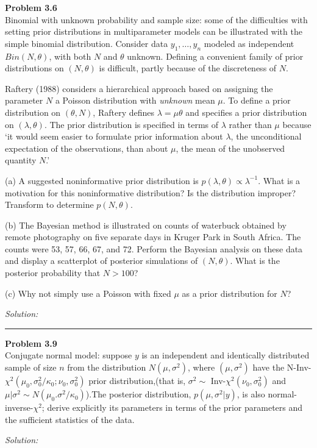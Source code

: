 \documentclass[a4paper, 11pt]{article}
\newenvironment{problem}[2][Problem]
    { \begin{mdframed}[backgroundcolor=gray!20] \textbf{#1 #2} \\}
    {  \end{mdframed}}
\newenvironment{solution}
    {\textit{Solution:}}
    {}
\begin{document}
\begin{problem}{3.6}
Binomial with unknown probability and sample size: some of the difficulties with setting prior distributions in multiparameter models can be 
illustrated with the simple binomial distribution. Consider data $y_1,\dots,y_n$ modeled as independent $Bin(N,\theta)$, with both $N$ and $\theta$ 
unknown. Defining a convenient family of prior distributions on $(N,\theta)$ is difficult, partly because of the discreteness of $N$.

Raftery (1988) considers a hierarchical approach based on assigning the parameter $N$ a Poisson distribution with \textit{unknown} mean $\mu$.
To define a prior distribution on $(\theta,N)$, Raftery defines $\lambda=\mu\theta$ and specifies a prior distribution on $(\lambda,\theta)$. 
The prior distribution is specified in terms of $\lambda$ rather than $\mu$ because ‘it would seem easier to formulate prior information 
about $\lambda$, the unconditional expectation of the observations, than about $\mu$, the mean of the unobserved quantity $N$.’

(a) A suggested noninformative prior distribution is $p(\lambda,\theta) \propto \lambda^{-1}$. What is a motivation for this noninformative distribution?
Is the distribution improper? Transform to determine $p(N,\theta)$.

(b) The Bayesian method is illustrated on counts of waterbuck obtained by remote photography on five separate days in Kruger Park in South Africa.
The counts were 53, 57, 66, 67, and 72. Perform the Bayesian analysis on these data and display a scatterplot of posterior simulations of $(N,\theta)$.
What is the posterior probability that $N>100$?

(c) Why not simply use a Poisson with fixed $\mu$ as a prior distribution for $N$?
\end{problem}
\begin{solution}

\end{solution}

\noindent\rule{7in}{2.8pt}


\begin{problem}{3.9}
Conjugate normal model: suppose $y$ is an independent and identically distributed sample of size $n$ from the distribution $N(\mu, \sigma^2)$, 
where $(\mu, \sigma^2)$ have the N-Inv-$\chi^2(\mu_0, \sigma_0^2/\kappa_0;\nu_0,\sigma_0^2)$ prior distribution,(that is, 
$\sigma^2 \sim$ Inv-$\chi^2(\nu_0,\sigma_0^2)$ and $\mu|\sigma^2 \sim N(\mu_0.\sigma^2/\kappa_0)$).The posterior distribution,
$p(\mu, \sigma^2|y)$, is also normal-inverse-$\chi^2$; derive explicitly its parameters in terms of 
the prior parameters and the sufficient statistics of the data.
\end{problem}
\begin{solution}

\end{solution}
\end{document}
